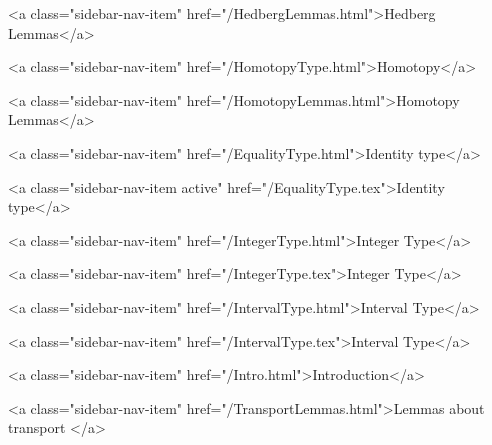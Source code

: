           <a class="sidebar-nav-item" href="/HedbergLemmas.html">Hedberg Lemmas</a>
        
      
    
      
        
          <a class="sidebar-nav-item" href="/HomotopyType.html">Homotopy</a>
        
      
    
      
        
          <a class="sidebar-nav-item" href="/HomotopyLemmas.html">Homotopy Lemmas</a>
        
      
    
      
        
          <a class="sidebar-nav-item" href="/EqualityType.html">Identity type</a>
        
      
    
      
        
          <a class="sidebar-nav-item active" href="/EqualityType.tex">Identity type</a>
        
      
    
      
        
          <a class="sidebar-nav-item" href="/IntegerType.html">Integer Type</a>
        
      
    
      
        
          <a class="sidebar-nav-item" href="/IntegerType.tex">Integer Type</a>
        
      
    
      
        
          <a class="sidebar-nav-item" href="/IntervalType.html">Interval Type</a>
        
      
    
      
        
          <a class="sidebar-nav-item" href="/IntervalType.tex">Interval Type</a>
        
      
    
      
        
          <a class="sidebar-nav-item" href="/Intro.html">Introduction</a>
        
      
    
      
        
          <a class="sidebar-nav-item" href="/TransportLemmas.html">Lemmas about transport </a>
        
      
    
      
        
